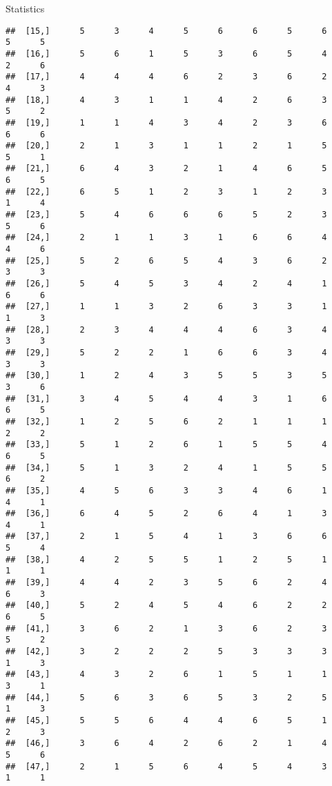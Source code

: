 \documentclass[
  ignorenonframetext,
]{beamer}
\begin{document}
\begin{frame}[fragile]{Statistics}
\begin{verbatim}
##  [15,]      5      3      4      5      6      6      5      6      5      5
##  [16,]      5      6      1      5      3      6      5      4      2      6
##  [17,]      4      4      4      6      2      3      6      2      4      3
##  [18,]      4      3      1      1      4      2      6      3      5      2
##  [19,]      1      1      4      3      4      2      3      6      6      6
##  [20,]      2      1      3      1      1      2      1      5      5      1
##  [21,]      6      4      3      2      1      4      6      5      6      5
##  [22,]      6      5      1      2      3      1      2      3      1      4
##  [23,]      5      4      6      6      6      5      2      3      5      6
##  [24,]      2      1      1      3      1      6      6      4      4      6
##  [25,]      5      2      6      5      4      3      6      2      3      3
##  [26,]      5      4      5      3      4      2      4      1      6      6
##  [27,]      1      1      3      2      6      3      3      1      1      3
##  [28,]      2      3      4      4      4      6      3      4      3      3
##  [29,]      5      2      2      1      6      6      3      4      3      3
##  [30,]      1      2      4      3      5      5      3      5      3      6
##  [31,]      3      4      5      4      4      3      1      6      6      5
##  [32,]      1      2      5      6      2      1      1      1      2      2
##  [33,]      5      1      2      6      1      5      5      4      6      5
##  [34,]      5      1      3      2      4      1      5      5      6      2
##  [35,]      4      5      6      3      3      4      6      1      4      1
##  [36,]      6      4      5      2      6      4      1      3      4      1
##  [37,]      2      1      5      4      1      3      6      6      5      4
##  [38,]      4      2      5      5      1      2      5      1      1      1
##  [39,]      4      4      2      3      5      6      2      4      6      3
##  [40,]      5      2      4      5      4      6      2      2      6      5
##  [41,]      3      6      2      1      3      6      2      3      5      2
##  [42,]      3      2      2      2      5      3      3      3      1      3
##  [43,]      4      3      2      6      1      5      1      1      3      1
##  [44,]      5      6      3      6      5      3      2      5      1      3
##  [45,]      5      5      6      4      4      6      5      1      2      3
##  [46,]      3      6      4      2      6      2      1      4      5      6
##  [47,]      2      1      5      6      4      5      4      3      1      1

\end{verbatim}
\end{frame}
\end{document}
